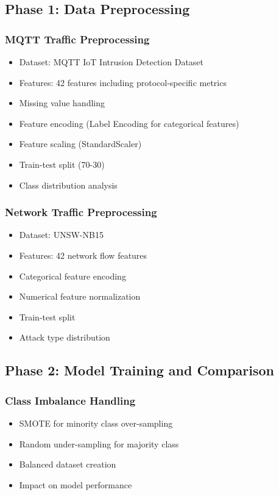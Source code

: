 \documentclass[conference]{IEEEtran}
\begin{document}
\subsection{Phase 1: Data Preprocessing}

\subsubsection{MQTT Traffic Preprocessing}
\begin{itemize}
    \item Dataset: MQTT IoT Intrusion Detection Dataset
    \item Features: 42 features including protocol-specific metrics
    \item Missing value handling
    \item Feature encoding (Label Encoding for categorical features)
    \item Feature scaling (StandardScaler)
    \item Train-test split (70-30)
    \item Class distribution analysis
\end{itemize}

\subsubsection{Network Traffic Preprocessing}
\begin{itemize}
    \item Dataset: UNSW-NB15
    \item Features: 42 network flow features
    \item Categorical feature encoding
    \item Numerical feature normalization
    \item Train-test split
    \item Attack type distribution
\end{itemize}

\subsection{Phase 2: Model Training and Comparison}

\subsubsection{Class Imbalance Handling}
\begin{itemize}
    \item SMOTE for minority class over-sampling
    \item Random under-sampling for majority class
    \item Balanced dataset creation
    \item Impact on model performance
\end{itemize}
\end{document}
